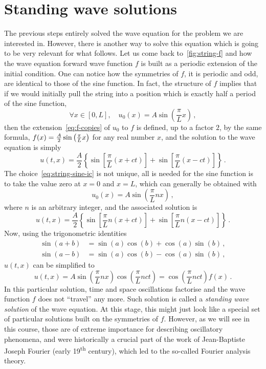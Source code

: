 \section{Standing wave solutions}
The previous steps entirely solved the wave equation for the problem we are interested
in. However, there is another way to solve this equation which is going to be very
relevant for what follows. Let us come back to~\cref{fig:string-f} and how the wave
equation forward wave function $f$ is built as a periodic extension of the initial
condition. One can notice how the symmetries of $f$, \ie it is periodic and odd, are
identical to those of the sine function. In fact, the structure of $f$ implies that if we
would initially pull the string into a position which is exactly half a period of the
sine function, \ie
\begin{equation}
	\forall x\in[0,L],\quad u_0(x)=A\sin\left(\frac{\pi}{L}x\right)\,,\label{eq:string-sine-ic}
\end{equation}
then the extension~\cref{eq:f-copies} of $u_0$ to $f$ is defined, up to a factor $2$, by
the same formula, \ie $f(x)=\smash{\frac{A}{2}\sin\left(\frac{\pi}{L}x\right)}$ for any
real number $x$, and the solution to the wave equation is simply
\begin{equation}
	u(t,x)=\frac{A}{2}\left\{\sin\left[\frac{\pi}{L}(x+ct)\right]
	+\sin\left[\frac{\pi}{L}(x-ct)\right]\right\}\,.
\end{equation}
The choice~\cref{eq:string-sine-ic} is not unique, all is needed for the sine function is
to take the value zero at $x=0$ and $x=L$, which can generally be obtained with
\begin{equation}
	u_0(x)=A\sin\left(\frac{\pi}{L}nx\right)\,,
\end{equation}
where $n$ is an arbitrary integer, and the associated solution is
\begin{equation}
	u(t,x)=\frac{A}{2}\left\{\sin\left[\frac{\pi}{L}n(x+ct)\right]
	+\sin\left[\frac{\pi}{L}n(x-ct)\right]\right\}\,.
	\label{eq:stand-wave-travel}
\end{equation}
Now, using the trigonometric identities
\begin{align}
	\sin(a+b) & =\sin(a)\cos(b)+\cos(a)\sin(b)\,, \\
	\sin(a-b) & =\sin(a)\cos(b)-\cos(a)\sin(b)\,,
\end{align}
$u(t,x)$ can be simplified to
\begin{equation}
	u(t,x)=A\sin\left(\frac{\pi}{L}nx\right)\cos\left(\frac{\pi}{L}nct\right)
	=\cos\left(\frac{\pi}{L}nct\right)f(x)\,.
	\label{eq:stand-wave-example}
\end{equation}
In this particular solution, time and space oscillations factorise and the wave function
$f$ does not ``travel'' any more. Such solution is called a \emph{standing wave solution}
of the wave equation. At this stage, this might just look like a special set of particular
solutions built on the symmetries of $f$. However, as we will see in this course, those
are of extreme importance for describing oscillatory phenomena, and were historically a
crucial part of the work of Jean-Baptiste Joseph Fourier (early 19\textsuperscript{th}
century), which led to the so-called Fourier analysis theory.

